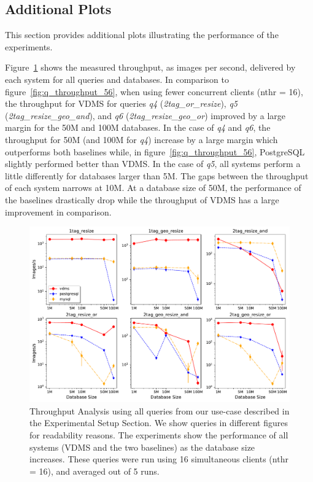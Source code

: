 \subsection{Additional Plots}
This section provides additional plots illustrating the performance of the experiments.

Figure~\ref{fig:q_throughput_16} shows the measured throughput,
as images per second, delivered by each system for all queries and databases.
In comparison to figure~\ref{fig:q_throughput_56}, when using fewer concurrent 
clients (nthr = 16), the throughput for VDMS for queries \textit{q4} (\textit{2tag\_or\_resize}), 
\textit{q5} (\textit{2tag\_resize\_geo\_and}), and
\textit{q6} (\textit{2tag\_resize\_geo\_or}) improved by a large margin 
for the 50M and 100M databases. 
In the case of \textit{q4} and \textit{q6}, the throughput for 50M (and 100M for \textit{q4})
increase by a large margin which outperforms both baselines while, in figure~\ref{fig:q_throughput_56},
PostgreSQL slightly performed better than VDMS. 
In the case of \textit{q5}, all systems perform a little differently for databases
larger than 5M.  The gaps between the throughput of each system narrows at 10M.  
At a database size of 50M, the performance of the baselines drastically drop
while the throughput of VDMS has a large improvement in comparison.

\begin{figure}[ht]
\includegraphics[width=\columnwidth]{figures/plot_th_16_mosaic_results_throughput}
\caption{Throughput Analysis using all queries from our use-case
described in the Experimental Setup Section.
We show queries in different figures for readability reasons.
The experiments show the performance of all systems (VDMS and the two baselines) as the
database size increases.
These queries were run using 16 simultaneous clients (nthr = 16),
and averaged out of 5 runs.}
\label{fig:q_throughput_16}
\end{figure}

